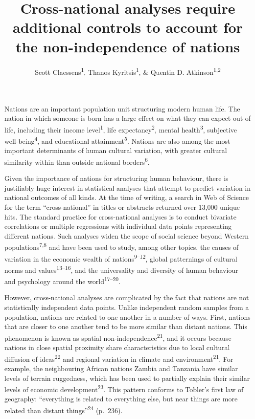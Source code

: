 \documentclass[
  man,floatsintext]{apa6}
\title{Cross-national analyses require additional controls to account for the non-independence of nations}
\author{Scott Claessens\textsuperscript{1}, Thanos Kyritsis\textsuperscript{1}, \& Quentin D. Atkinson\textsuperscript{1,2}}
\date{}
\affiliation{\vspace{0.5cm}\textsuperscript{1} \footnotesize School of Psychology, University of Auckland, Auckland, New Zealand\\\textsuperscript{2} \footnotesize School of Anthropology and Museum Ethnography, University of Oxford, Oxford, United Kingdom}
\begin{document}
\maketitle

\linenumbers

Nations are an important population unit structuring modern human life. The nation in which someone is born has a large effect on what they can expect out of life, including their income level\textsuperscript{1}, life expectancy\textsuperscript{2}, mental health\textsuperscript{3}, subjective well-being\textsuperscript{4}, and educational attainment\textsuperscript{5}. Nations are also among the most important determinants of human cultural variation, with greater cultural similarity within than outside national borders\textsuperscript{6}.

Given the importance of nations for structuring human behaviour, there is justifiably huge interest in statistical analyses that attempt to predict variation in national outcomes of all kinds. At the time of writing, a search in Web of Science for the term ``cross-national'' in titles or abstracts returned over 13,000 unique hits. The standard practice for cross-national analyses is to conduct bivariate correlations or multiple regressions with individual data points representing different nations. Such analyses widen the scope of social science beyond Western populations\textsuperscript{7,8} and have been used to study, among other topics, the causes of variation in the economic wealth of nations\textsuperscript{9--12}, global patternings of cultural norms and values\textsuperscript{13--16}, and the universality and diversity of human behaviour and psychology around the world\textsuperscript{17--20}.

However, cross-national analyses are complicated by the fact that nations are not statistically independent data points. Unlike independent random samples from a population, nations are related to one another in a number of ways. First, nations that are closer to one another tend to be more similar than distant nations. This phenomenon is known as spatial non-independence\textsuperscript{21}, and it occurs because nations in close spatial proximity share characteristics due to local cultural diffusion of ideas\textsuperscript{22} and regional variation in climate and environment\textsuperscript{21}. For example, the neighbouring African nations Zambia and Tanzania have similar levels of terrain ruggedness, which has been used to partially explain their similar levels of economic development\textsuperscript{23}. This pattern conforms to Tobler's first law of geography: ``everything is related to everything else, but near things are more related than distant things''\textsuperscript{24} (p.~236).
\end{document}
